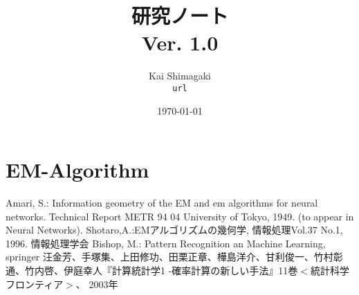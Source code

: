 \documentclass[a4j,10pt,oneside,openany]{jsbook}
\title{{\Huge \textbf{研究ノート}}\\ {\small Ver. 1.0}}
\author{Kai Shimagaki\\ \texttt{url}}
\date{\today}
\begin{document}
%
%
\maketitle
\frontmatter
\tableofcontents
%
%
\mainmatter

\chapter{EM-Algorithm}
		

\appendix 
		
	
	
\begin{thebibliography}{3}
 Amari, S.: Information geometry of the EM and em algorithms for neural networks. Technical Report METR 94 04 University of Tokyo, 1949. (to appear in Neural Networks).
Shotaro,A.:EMアルゴリズムの幾何学, 情報処理Vol.37 No.1, 1996. 情報処理学会
Bishop, M.: Pattern Recognition an Machine Learning, springer
汪金芳、手塚集、上田修功、田栗正章、樺島洋介、甘利俊一、竹村彰通、竹内啓、伊庭幸人『計算統計学1 -確率計算の新しい手法』11巻$<$統計科学フロンティア$>$、 2003年
\end{thebibliography}

\newpage
\printindex
%
%
\end{document}
